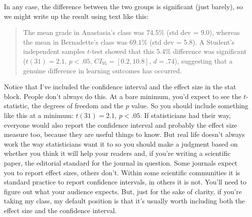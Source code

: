 In any case, the difference between the two groups is significant (just barely), so we might write up the result using text like this:
\begin{quote}
The mean grade in Anastasia's class was 74.5\% (std dev = 9.0), whereas the mean in Bernadette's class was 69.1\% (std dev = 5.8). A Student's independent samples $t$-test showed that this 5.4\% difference was significant ($t(31) = 2.1$, $p<.05$, $CI_{95} = [0.2, 10.8]$, $d = .74$), suggesting that a genuine difference in learning outcomes has occurred.  
\end{quote}
Notice that I've included the confidence interval and the effect size in the stat block. People don't always do this. At a bare minimum, you'd expect to see the $t$-statistic, the degrees of freedom and the $p$ value. So you should include something like this at a minimum: $t(31) = 2.1$, $p<.05$. If statisticians had their way, everyone would also report the confidence interval and probably the effect size measure too, because they are useful things to know. But real life doesn't always work the way statisticians want it to so you should make a judgment based on whether you think it will help your readers and, if you’re writing a scientific paper, the editorial standard for the journal in question. Some journals expect you to report effect sizes, others don't. Within some scientific communities it is standard practice to report confidence intervals, in others it is not. You'll need to figure out what your audience expects. But, just for the sake of clarity, if you're taking my class, my default position is that it's usually worth including both the effect size and the confidence interval.
 

